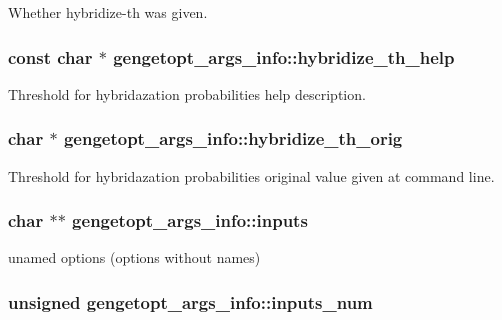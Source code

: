Whether hybridize-\/th was given. 

\hypertarget{structgengetopt__args__info_a80b3003903fe0c9bfe6cacffcff587ae}{
\subsubsection[{hybridize\+\_\+th\+\_\+help}]{\setlength{\rightskip}{0pt plus 5cm}const char $\ast$ gengetopt\+\_\+args\+\_\+info\+::hybridize\+\_\+th\+\_\+help}}\label{structgengetopt__args__info_a80b3003903fe0c9bfe6cacffcff587ae}


Threshold for hybridazation probabilities help description. 

\hypertarget{structgengetopt__args__info_af5ad30ce558e2a362b45f25eac7c2d8a}{
\subsubsection[{hybridize\+\_\+th\+\_\+orig}]{\setlength{\rightskip}{0pt plus 5cm}char $\ast$ gengetopt\+\_\+args\+\_\+info\+::hybridize\+\_\+th\+\_\+orig}}\label{structgengetopt__args__info_af5ad30ce558e2a362b45f25eac7c2d8a}


Threshold for hybridazation probabilities original value given at command line. 

\hypertarget{structgengetopt__args__info_a6fe9c1a32bc4c64a2ca4e3cfce05b147}{
\subsubsection[{inputs}]{\setlength{\rightskip}{0pt plus 5cm}char $\ast$$\ast$ gengetopt\+\_\+args\+\_\+info\+::inputs}}\label{structgengetopt__args__info_a6fe9c1a32bc4c64a2ca4e3cfce05b147}


unamed options (options without names) 

\hypertarget{structgengetopt__args__info_a3d69c180d5ac0b1124fd9a6fe680706c}{
\subsubsection[{inputs\+\_\+num}]{\setlength{\rightskip}{0pt plus 5cm}unsigned gengetopt\+\_\+args\+\_\+info\+::inputs\+\_\+num}}\label{structgengetopt__args__info_a3d69c180d5ac0b1124fd9a6fe680706c}


